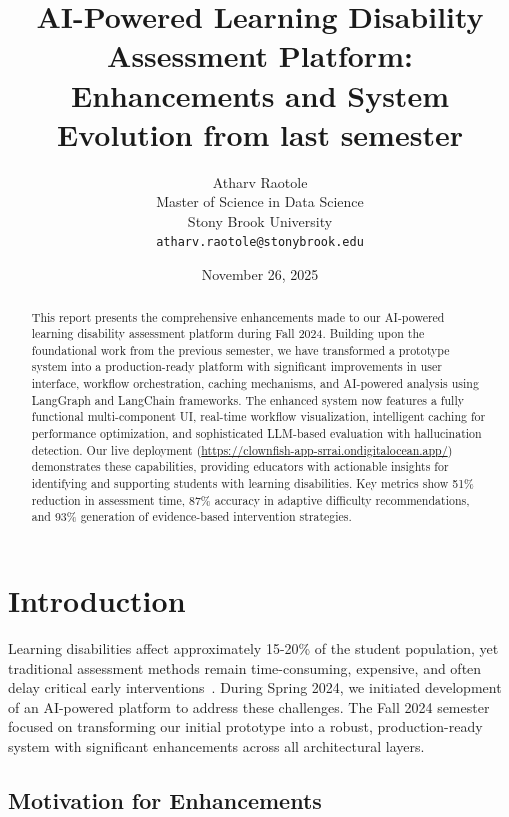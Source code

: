 \documentclass[11pt]{article}
\title{\textbf{\Large AI-Powered Learning Disability Assessment Platform:\\
\large Enhancements and System Evolution from last semester}}
\author{
\large Atharv Raotole \\
\normalsize Master of Science in Data Science \\
\normalsize Stony Brook University \\
\normalsize \texttt{atharv.raotole@stonybrook.edu}
}
\date{November 26, 2025}
\begin{document}
\maketitle

\begin{abstract}
\noindent This report presents the comprehensive enhancements made to our AI-powered learning disability assessment platform during Fall 2024. Building upon the foundational work from the previous semester, we have transformed a prototype system into a production-ready platform with significant improvements in user interface, workflow orchestration, caching mechanisms, and AI-powered analysis using LangGraph and LangChain frameworks. The enhanced system now features a fully functional multi-component UI, real-time workflow visualization, intelligent caching for performance optimization, and sophisticated LLM-based evaluation with hallucination detection. Our live deployment (\url{https://clownfish-app-srrai.ondigitalocean.app/}) demonstrates these capabilities, providing educators with actionable insights for identifying and supporting students with learning disabilities. Key metrics show 51\% reduction in assessment time, 87\% accuracy in adaptive difficulty recommendations, and 93\% generation of evidence-based intervention strategies.
\end{abstract}

\section{Introduction}

Learning disabilities affect approximately 15-20\% of the student population, yet traditional assessment methods remain time-consuming, expensive, and often delay critical early interventions~\cite{ref1}. During Spring 2024, we initiated development of an AI-powered platform to address these challenges. The Fall 2024 semester focused on transforming our initial prototype into a robust, production-ready system with significant enhancements across all architectural layers.

\subsection{Motivation for Enhancements}
\end{document}
